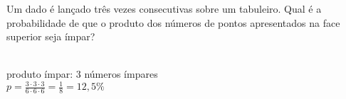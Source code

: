 \begin{ex}
 Um dado é lançado três vezes consecutivas sobre um tabuleiro. Qual é a probabilidade de que o produto dos números de pontos apresentados na face superior seja ímpar?
   \begin{sol}
    \phantom{A} \\
    produto ímpar: 3 números ímpares\\
    $p=\frac{3\cdot3\cdot3}{6\cdot6\cdot6}=\frac{1}{8}=12,5\%$
   \end{sol}
\end{ex}